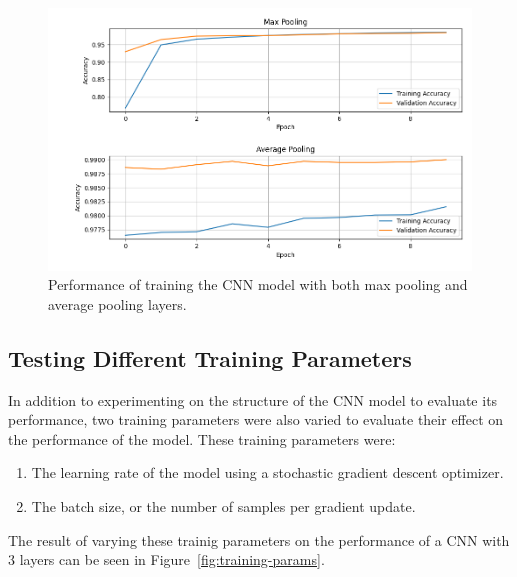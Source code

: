 \documentclass[a4paper]{article}
\begin{document}
\begin{figure}[h]
    \centering
    \includegraphics[scale=0.5]{images/max-avg-pooling-cnn.png}
    \caption{Performance of training the CNN model with both max pooling and average pooling layers.}
    \label{fig:pooling}
\end{figure}

\subsection{Testing Different Training Parameters}
In addition to experimenting on the structure of the CNN model to evaluate its performance, two training parameters were also varied to evaluate their effect on the performance of the model. These training parameters were:
\begin{enumerate}
    \item The learning rate of the model using a stochastic gradient descent optimizer.
    \item The batch size, or the number of samples per gradient update.
\end{enumerate}
The result of varying these trainig parameters on the performance of a CNN with 3 layers can be seen in Figure~\ref{fig:training-params}.
\end{document}
